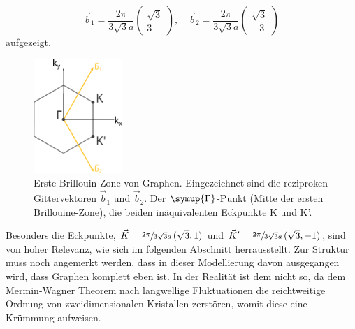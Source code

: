 \begin{equation*}
    \vec{b}_1 = \frac{2\pi}{3\sqrt{3}a} \begin{pmatrix}  \sqrt{3}\\[4pt] 3  \end{pmatrix}, \quad
    \vec{b}_2 = \frac{2\pi}{3\sqrt{3}a} \begin{pmatrix}  \sqrt{3}\\[4pt] -3 \end{pmatrix}       
\end{equation*}    
aufgezeigt.
\begin{figure}
    \centering
    \includegraphics[width = 0.3\textwidth]{Plots/graphene_first_brillouine_zone.pdf}
    \caption{Erste Brillouin-Zone von Graphen.
    Eingezeichnet sind die reziproken Gittervektoren $\vec{b}_1$ und $\vec{b}_2$.
    Der $\symup{\Gamma}$-Punkt (Mitte der ersten Brillouine-Zone), die beiden inäquivalenten
    Eckpunkte K und K'.}
    \label{fig:first-brillouine-zone}
\end{figure}
Besonders die Eckpunkte, $\vec{K} = \sfrac{2\pi}{3\sqrt{3}a} \, (\sqrt{3},1)$ 
und $\vec{K}' = \sfrac{2\pi}{3\sqrt{3}a} \, (\sqrt{3},-1)$, sind von hoher Relevanz, wie sich im folgenden Abschnitt herrausstellt.
Zur Struktur muss noch angemerkt werden, dass in dieser Modellierung davon ausgegangen wird, dass Graphen komplett eben ist. 
In der Realität ist dem nicht so, da dem Mermin-Wagner Theorem nach langwellige Fluktuationen die reichtweitige Ordnung von zweidimensionalen Kristallen zerstören, womit
diese eine Krümmung aufweisen.\cite{Fasolino2007}
\FloatBarrier

